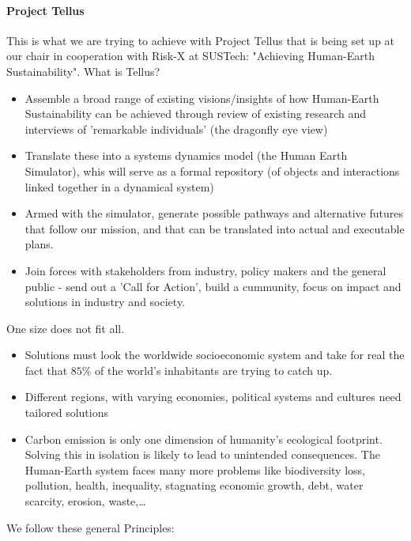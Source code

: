 \paragraph{Project Tellus}

This is what we are trying to achieve with Project Tellus that is being set
up at our chair in cooperation with Risk-X at SUSTech:
"Achieving Human-Earth Sustainability". What is Tellus?
\begin{itemize}
    \item Assemble a broad range of existing visions/insights of how Human-Earth
        Sustainability can be achieved through review of existing research
        and interviews of 'remarkable individuals' (the dragonfly eye view)
    \item Translate these into a systems dynamics model (the Human Earth
        Simulator), whis will serve as a formal repository (of objects and
        interactions linked together in a dynamical system)
    \item Armed with the simulator, generate possible pathways and alternative
        futures that follow our mission, and that can be translated into
        actual and executable plans.
    \item Join forces with stakeholders from industry, policy makers and the
        general public - send out a 'Call for Action', build a cummunity,
        focus on impact and solutions in industry and society.
\end{itemize}

One size does not fit all.

\begin{itemize}
    \item Solutions must look the worldwide socioeconomic system and take
        for real the fact that $85\%$ of the world's inhabitants are trying
        to catch up.
    \item Different regions, with varying economies, political systems and
        cultures need tailored solutions
    \item Carbon emission is only one dimension of humanity's ecological
        footprint. Solving this in isolation is likely to lead to unintended
        consequences. The Human-Earth system faces many more problems like
        biodiversity loss, pollution, health, inequality, stagnating
        economic growth, debt, water scarcity, erosion, waste,\dots
\end{itemize}

We follow these general Principles:

